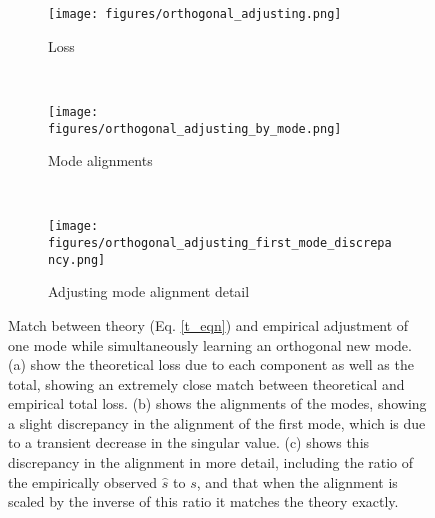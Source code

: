 \documentclass{article}
\begin{document}
\begin{figure}
\centering
\begin{subfigure}[b]{0.49\textwidth}
\texttt{[image: figures/orthogonal\_adjusting.png]}
\caption{Loss} 
\end{subfigure}~%
\begin{subfigure}[b]{0.49\textwidth}
\texttt{[image: figures/orthogonal\_adjusting\_by\_mode.png]}
\caption{Mode alignments} 
\end{subfigure}\\
\begin{subfigure}[b]{0.49\textwidth}
\texttt{[image: figures/orthogonal\_adjusting\_first\_mode\_discrepancy.png]}
\caption{Adjusting mode alignment detail} 
\end{subfigure}
\caption{Match between theory (Eq. \ref{t_eqn}) and empirical adjustment of one mode while simultaneously learning an orthogonal new mode. (a) show the theoretical loss due to each component as well as the total, showing an extremely close match between theoretical and empirical total loss. (b) shows the alignments of the modes, showing a slight discrepancy in the alignment of the first mode, which is due to a transient decrease in the singular value. (c) shows this discrepancy in the alignment in more detail, including the ratio of the empirically observed $\hat{s}$ to $s$, and that when the alignment is scaled by the inverse of this ratio it matches the theory exactly.}
\label{orth_adj_fig}
\end{figure}
\end{document}
